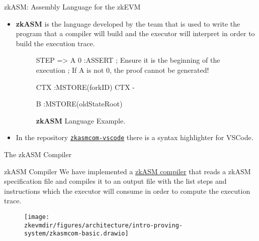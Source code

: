 \begin{frame}[fragile]{zkASM: Assembly Language for the zkEVM}
\begin{itemize}

\item \textbf{zkASM} is the language developed by the team that is used to write the program that a compiler will build and the executor will interpret in order to build the execution trace.

\vspace{1em}

\begin{figure}
\begin{zkasm}
STEP => A
0                                   :ASSERT ; Ensure it is the beginning of the execution 
                                            ; If A is not 0, the proof cannot be generated!

CTX                                 :MSTORE(forkID)
CTX - %

B                                   :MSTORE(oldStateRoot)
\end{zkasm}
\textbf{zkASM} Language Example.
\end{figure}

\vspace{1em}

\item In the repository \href{https://github.com/0xPolygonHermez/zkasmcom-vscode}{\texttt{zkasmcom-vscode}} there is a syntax highlighter for VSCode.

\end{itemize}
\end{frame}






\begin{frame}{The zkASM Compiler}

\begin{block}{zkASM Compiler}
We have implemented a \href{https://github.com/0xPolygonHermez/zkasmcom}{zkASM compiler} that reads a zkASM specification file and compiles it to an output file with the list steps and instructions which the executor will consume in order to compute the execution trace.
\end{block}

\begin{figure}
\texttt{[image: \\zkevmdir/figures/architecture/intro-proving-system/zkasmcom-basic.drawio]}
\end{figure}

\end{frame}







